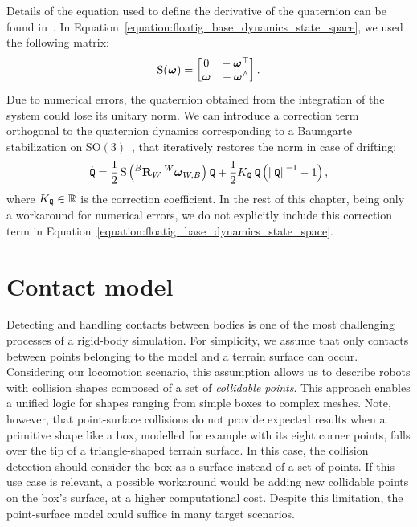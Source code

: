 \begin{remark*}
%
Details of the equation used to define the derivative of the quaternion can be found in~\cite{sola_quaternion_2017}.
In Equation~\eqref{equation:floatig_base_dynamics_state_space}, we used the following matrix:
%
\begin{equation*}
    \operatorname{S}(\prescript{}{}{\boldsymbol{\omega}}) =
    \begin{bmatrix}
        0 & -\prescript{}{}{\boldsymbol{\omega}}^\top \\ \prescript{}{}{\boldsymbol{\omega}} & -\prescript{}{}{\boldsymbol{\omega}}^\wedge
    \end{bmatrix}
    .
\end{equation*}
%
Due to numerical errors, the quaternion obtained from the integration of the system could lose its unitary norm.
We can introduce a correction term orthogonal to the quaternion dynamics corresponding to a Baumgarte stabilization on SO$(3)$~\citep{gros_baumgarte_2015}, that iteratively restores the norm in case of drifting:
%
\begin{equation*}
    \dot\quat = \frac{1}{2} \operatorname{S}\left( \rot[B]_W \velang[W]_{W,B} \right) \quat + \frac{1}{2} K_{\quat} \quat \left( \norm{\quat}^{-1} - 1 \right)
    ,
\end{equation*}
%
where $K_{\prescript{}{}{\mathtt{Q}}} \in \mathbb{R}$ is the correction coefficient.
In the rest of this chapter, being only a workaround for numerical errors, we do not explicitly include this correction term in Equation~\eqref{equation:floatig_base_dynamics_state_space}.
%
\end{remark*}

\section{Contact model}
\label{section:contact_model}

Detecting and handling contacts between bodies is one of the most challenging processes of a rigid-body simulation.
For simplicity, we assume that only contacts between points belonging to the model and a terrain surface can occur.
Considering our locomotion scenario, this assumption allows us to describe robots with collision shapes composed of a set of \emph{collidable points}.
This approach enables a unified logic for shapes ranging from simple boxes to complex meshes.
Note, however, that point-surface collisions do not provide expected results when a primitive shape like a box, modelled for example with its eight corner points, falls over the tip of a triangle-shaped terrain surface.
In this case, the collision detection should consider the box as a surface instead of a set of points.
If this use case is relevant, a possible workaround would be adding new collidable points on the box's surface, at a higher computational cost.
Despite this limitation, the point-surface model could suffice in many target scenarios.

